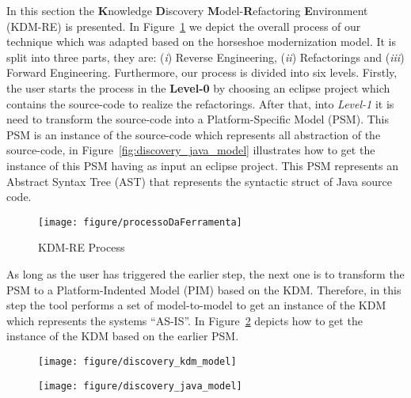 In this section the \textbf{K}nowledge \textbf{D}iscovery \textbf{M}odel-\textbf{R}efactoring \textbf{E}nvironment (KDM-RE) is presented. In Figure~\ref{fig:process} we depict the overall process of our technique which was adapted based on the horseshoe modernization model. It is split into three parts, they are: (\textit{i}) Reverse Engineering, (\textit{ii}) Refactorings and (\textit{iii}) Forward Engineering. Furthermore, our process is divided into six levels. Firstly, the user starts the process in the \textbf{Level-0} by choosing an eclipse project which contains the source-code to realize the refactorings.  After that, into \textit{Level-1} it is need to transform the source-code into a Platform-Specific Model (PSM). This PSM is an instance of the source-code which represents all abstraction of the source-code, in Figure~\ref{fig:discovery_java_model} illustrates how to get the instance of this PSM having as input an eclipse project. This PSM represents an Abstract Syntax Tree (AST) that represents the syntactic struct of Java source code.

\begin{figure}[!ht]
\centering
  \texttt{[image: figure/processoDaFerramenta]}
\caption{KDM-RE Process}
\label{fig:process}
\end{figure} 

As long as the user has triggered the earlier step, the next one is to transform the PSM to a Platform-Indented Model (PIM) based on the KDM. Therefore, in this step the tool performs a set of model-to-model to get an instance of the KDM which represents the systems ``AS-IS''. In Figure~\ref{fig:discovery_kdm_model} depicts how to get the instance of the KDM based on the earlier PSM.

\begin{figure}
\centering
\begin{minipage}{.5\textwidth}
  \centering
  \texttt{[image: figure/discovery\_kdm\_model]}
  \label{fig:discovery_java_model}
\end{minipage}%
\begin{minipage}{.5\textwidth}
  \centering
  \texttt{[image: figure/discovery\_java\_model]}
  \label{fig:discovery_kdm_model}
\end{minipage}
\end{figure}